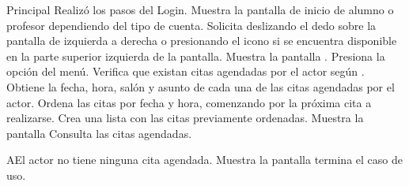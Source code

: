 \begin{UCtrayectoria}{Principal}
	\UCpaso[\UCactor]Realizó los pasos del Login.
	\UCpaso Muestra la pantalla de inicio de alumno o profesor dependiendo del tipo de cuenta.
	\UCpaso[\UCactor] Solicita deslizando el dedo sobre la pantalla de izquierda a derecha o presionando 
	el icono  si se encuentra disponible en la parte superior izquierda de la pantalla.
	\UCpaso Muestra la pantalla .
	\UCpaso[\UCactor] Presiona la opción  del menú.
	\UCpaso Verifica que existan citas agendadas por el actor según .  
	\UCpaso Obtiene la fecha, hora, salón y asunto de cada una de las citas agendadas por el actor.
	\UCpaso Ordena las citas por fecha y hora, comenzando por la próxima cita a realizarse.
	\UCpaso Crea una lista con las citas previamente ordenadas.
	\UCpaso Muestra la pantalla 
	\UCpaso[\UCactor] Consulta las citas agendadas. %
\end{UCtrayectoria}
		

\begin{UCtrayectoriaA}{A}{El actor no tiene ninguna cita agendada.}
	\UCpaso Muestra la pantalla 
	\UCpaso termina el caso de uso.
\end{UCtrayectoriaA}


